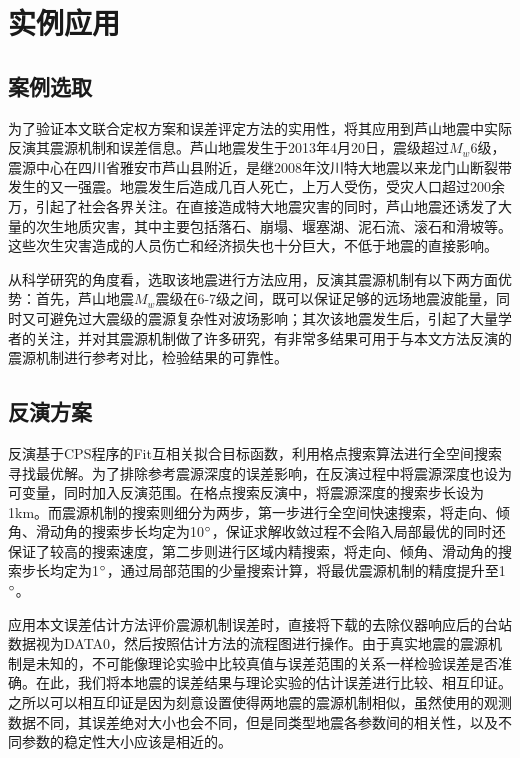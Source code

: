 

\chapter{实例应用}

\section{案例选取}

为了验证本文联合定权方案和误差评定方法的实用性，将其应用到芦山地震中实际反演其震源机制和误差信息。芦山地震发生于2013年4月20日，震级超过$M_w$6级，震源中心在四川省雅安市芦山县附近，是继2008年汶川特大地震以来龙门山断裂带发生的又一强震。地震发生后造成几百人死亡，上万人受伤，受灾人口超过200余万，引起了社会各界关注。在直接造成特大地震灾害的同时，芦山地震还诱发了大量的次生地质灾害，其中主要包括落石、崩塌、堰塞湖、泥石流、滚石和滑坡等。这些次生灾害造成的人员伤亡和经济损失也十分巨大，不低于地震的直接影响。

从科学研究的角度看，选取该地震进行方法应用，反演其震源机制有以下两方面优势：首先，芦山地震$M_w$震级在6-7级之间，既可以保证足够的远场地震波能量，同时又可避免过大震级的震源复杂性对波场影响；其次该地震发生后，引起了大量学者的关注，并对其震源机制做了许多研究，有非常多结果可用于与本文方法反演的震源机制进行参考对比，检验结果的可靠性。

\section{反演方案}
反演基于CPS程序的Fit互相关拟合目标函数，利用格点搜索算法进行全空间搜索寻找最优解。为了排除参考震源深度的误差影响，在反演过程中将震源深度也设为可变量，同时加入反演范围。在格点搜索反演中，将震源深度的搜索步长设为1km。而震源机制的搜索则细分为两步，第一步进行全空间快速搜索，将走向、倾角、滑动角的搜索步长均定为10$^\circ$，保证求解收敛过程不会陷入局部最优的同时还保证了较高的搜索速度，第二步则进行区域内精搜索，将走向、倾角、滑动角的搜索步长均定为1$^\circ$，通过局部范围的少量搜索计算，将最优震源机制的精度提升至1$^\circ$。

应用本文误差估计方法评价震源机制误差时，直接将下载的去除仪器响应后的台站数据视为DATA0，然后按照估计方法的流程图进行操作。由于真实地震的震源机制是未知的，不可能像理论实验中比较真值与误差范围的关系一样检验误差是否准确。在此，我们将本地震的误差结果与理论实验的估计误差进行比较、相互印证。之所以可以相互印证是因为刻意设置使得两地震的震源机制相似，虽然使用的观测数据不同，其误差绝对大小也会不同，但是同类型地震各参数间的相关性，以及不同参数的稳定性大小应该是相近的。

